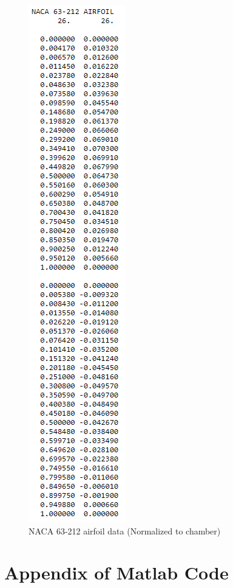 \documentclass[12pt]{article}
\begin{document}
    \begin{figure}[h]
    \includegraphics[width=2.5 cm]{dat.PNG}
    \centering
    \caption{NACA 63-212 airfoil data (Normalized to chamber)}
    \end{figure}

\newpage
\section{Appendix of Matlab Code}
\end{document}
